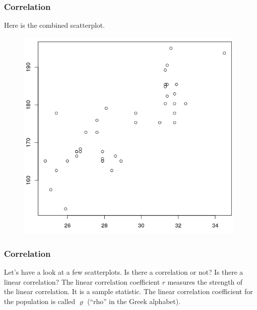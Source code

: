 \documentclass[xcolor=dvipsnames]{beamer}
\begin{document}
\begin{frame}
  \frametitle{Correlation}
Here is the combined scatterplot.
  \begin{figure}[h]
    \includegraphics[scale=0.35]{./diagrams/mfshoeprintheight.png}
  \end{figure}
\end{frame}

\begin{frame}
  \frametitle{Correlation}
  Let's have a look at a few scatterplots. Is there a correlation or
  not? Is there a linear correlation? The \alert{linear correlation
    coefficient} $r$ measures the strength of the linear correlation.
  It is a sample statistic. The linear correlation coefficient for the
  population is called $\varrho$ (``rho'' in the Greek alphabet).
\end{frame}
\end{document}
